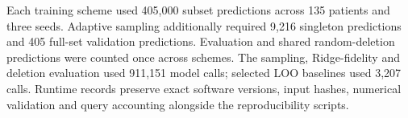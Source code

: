 Each training scheme used 405,000 subset predictions across 135 patients and three seeds. Adaptive sampling additionally required 9,216 singleton predictions and 405 full-set validation predictions. Evaluation and shared random-deletion predictions were counted once across schemes. The sampling, Ridge-fidelity and deletion evaluation used 911,151 model calls; selected LOO baselines used 3,207 calls. Runtime records preserve exact software versions, input hashes, numerical validation and query accounting alongside the reproducibility scripts.


